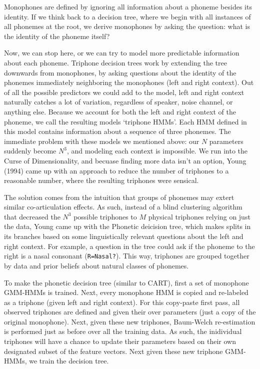 \documentclass[10pt,a4paper]{article}
\begin{document}
\begin{enumerate}
    Monophones are defined by ignoring all information about a phoneme besides its identity. If we think back to a decision tree, where we begin with all instances of all phonemes at the root, we derive monophones by asking the question: what is the identity of the phoneme itself?


    Now, we can stop here, or we can try to model more predictable information about each phoneme. Triphone decision trees work by extending the tree downwards from monophones, by asking questions about the identity of the phonemes immediately neighboring the monophones (left and right context). Out of all the possible predictors we could add to the model, left and right context naturally catches a lot of variation, regardless of speaker, noise channel, or anything else. Because we account for both the left and right context of the phoneme, we call the resulting models `triphone HMMs'. Each HMM defined in this model contains information about a sequence of three phonemes. The immediate problem with these models we mentioned above: our $N$ parameters suddenly become $N^3$, and modeling each context is impossible. We run into the Curse of Dimensionality, and becuase finding more data isn't an option, Young (1994) came up with an approach to reduce the number of triphones to a reasonable number, where the resulting triphones were sensical.

    The solution comes from the intuition that groups of phonemes may extert similar co-articulation effects. As such, instead of a blind clustering algorithm that decreased the $N^3$ possible triphones to $M$ physical triphones relying on just the data, Young came up with the Phonetic deicision tree, which makes splits in its branches based on some linguistically relevant questions about the left and right context. For example, a question in the tree could ask if the phoneme to the right is a nasal consonant (\texttt{R=Nasal?}). This way, triphones are grouped together by data and prior beliefs about natural classes of phonemes.

    To make the phonetic decision tree (similar to CART), first a set of monophone GMM-HMMs is trained. Next, every monophone HMM is copied and re-labeled as a triphone (given left and right context). For this copy-paste first pass, all observed triphones are defined and given their over parameters (just a copy of the original monophone). Next, given these new triphones, Baum-Welch re-estimation is performed just as before over all the training data. As such, the inidividual triphones will have a chance to update their parameters based on their own designated subset of the feature vectors. Next given these new triphone GMM-HMMs, we train the decision tree.


\end{enumerate}
\end{document}
